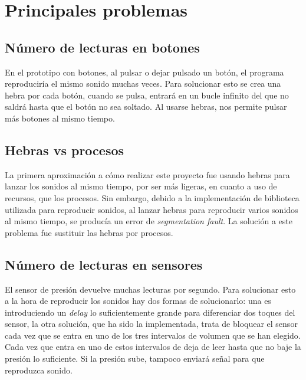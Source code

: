 
    \section{Principales problemas} %
    \label{sec:PrincipalesProblemas}

        \subsection{Número de lecturas en botones} %
        \label{sub:NumeroDeLecturasEnBotones}

            En el prototipo con botones, al pulsar o dejar pulsado un botón, el programa reproduciría el mismo
            sonido muchas veces. Para solucionar esto se crea una hebra por cada botón, cuando se pulsa, entrará
            en un bucle infinito del que no saldrá hasta que el botón no sea soltado. Al usarse hebras, nos
            permite pulsar más botones al mismo tiempo.


        \subsection{Hebras vs procesos} %
        \label{sub:HebrasVSProcesos}

            La primera aproximación a cómo realizar este proyecto fue usando hebras para lanzar los sonidos al mismo
            tiempo, por ser más ligeras, en cuanto a uso de recursos, que los procesos. Sin embargo, debido a la
            implementación de biblioteca utilizada para reproducir sonidos, al lanzar hebras para reproducir varios
            sonidos al mismo tiempo, se producía un error de \textit{segmentation fault}. La solución a este problema
            fue sustituir las hebras por procesos.


        \subsection{Número de lecturas en sensores} %
        \label{sub:NumeroDeLecturasEnSensores}

            El sensor de presión devuelve muchas lecturas por segundo. Para solucionar esto a la hora de reproducir los
            sonidos hay dos formas de solucionarlo: una es introduciendo un \textit{delay} lo suficientemente grande
            para diferenciar dos toques del sensor, la otra solución, que ha sido la implementada, trata de bloquear el
            sensor cada vez que se entra en uno de los tres intervalos de volumen que se han elegido. Cada vez que entra
            en uno de estos intervalos de deja de leer hasta que no baje la presión lo suficiente. Si la presión sube,
            tampoco enviará señal para que reproduzca sonido.

